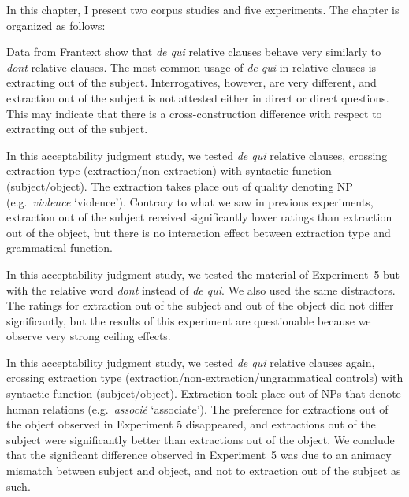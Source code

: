 In this chapter, I present two corpus studies and five experiments. The chapter is organized as follows:

\begin{description}
\sloppy
\item[Corpus studies on \emph{de qui}:] Data from Frantext show that \emph{de qui} relative clauses behave very similarly to \emph{dont} relative clauses. The most common usage of \emph{de qui} in relative clauses is extracting out of the subject. Interrogatives, however, are very different, and extraction out of the subject is not attested either in direct or direct questions. This may indicate that there is a cross-construction difference with respect to extracting out of the subject. 

\item[Experiment 5:] In this acceptability judgment study, we tested \emph{de qui} relative clauses, crossing extraction type (extraction\slash non-extraction) with syntactic function (subject\slash object). The extraction takes place out of quality denoting NP (e.g.\ \emph{violence} `violence'). Contrary to what we saw in previous experiments, extraction out of the subject received significantly lower ratings than extraction out of the object, but there is no interaction effect between extraction type and grammatical function.

\item[Experiment 6:] In this acceptability judgment study, we tested the material of Experiment~5 but with the relative word \emph{dont} instead of \emph{de qui}. We also used the same distractors. The ratings for extraction out of the subject and out of the object did not differ significantly, but the results of this experiment are questionable because we observe very strong ceiling effects. 

\item[Experiment 7:] In this acceptability judgment study, we tested \emph{de qui} relative clauses again, crossing extraction type (extraction\slash non-extraction\slash ungrammatical controls) with syntactic function (subject\slash object). Extraction took place out of NPs that denote human relations (e.g.\ \emph{associé} `associate'). The preference for extractions out of the object observed in Experiment 5 disappeared, and extractions out of the subject were significantly better than extractions out of the object. We conclude that the significant difference observed in Experiment~5 was due to an animacy mismatch between subject and object, and not to extraction out of the subject as such.


\end{description}
